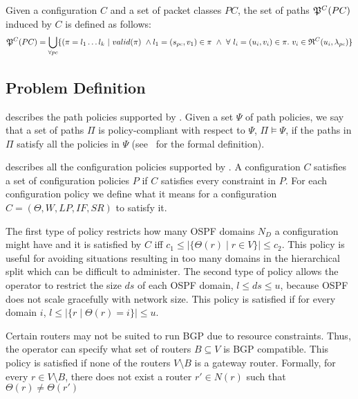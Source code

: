\begin{definition}
Given a configuration $C$ and a set of packet classes $PC$, the set of paths
$\mathfrak{P}^C(PC)$ induced by $C$ is defined as follows: 
\[
\mathfrak{P}^C(PC) = \bigcup_{\forall pc} \{(\pi=l_1\ldots l_k ~|~ valid(\pi) ~\wedge l_1 = (s_{pc}, v_1) \in \pi  ~\wedge ~\forall ~l_i=(u_i, v_i) \in \pi. ~v_i \in \mathfrak{R}^C(u_i,\lambda_{pc})\}
\]
\end{definition}

\subsection{Problem Definition}



 describes the path policies supported by \name.
Given  a set $\Psi$ of
path policies, we say that
a set of paths $\Pi$ is policy-compliant with respect to $\Psi$, $\Pi \models \Psi$,
if the paths in $\Pi$ satisfy all the policies in $\Psi$ (see~\cite{genesis} for the formal definition). 


 describes all the configuration policies supported by \name.
A configuration $C$ satisfies a set of configuration policies $P$
if $C$ satisfies every constraint in $P$.
For each configuration policy 
we define what it means for  a configuration $C=(\Theta,W,LP,IF,SR)$ to satisfy it.

The first type of policy restricts how many OSPF domains $N_D$ a
configuration might have
and it is satisfied by $C$ iff $c_1\leq |\{\Theta(r)\mid r\in V\}|\leq
c_2$.  This policy is useful for avoiding situations resulting in too
many domains in the hierarchical split which can be difficult to
administer.  The second type of policy allows the operator to restrict
the size $ds$ of each OSPF domain, $l\leq ds\leq u$, because OSPF does
not scale gracefully with network size.  This policy is satisfied if
for every domain $i$, $l\leq |\{r \mid \Theta(r)=i\}|\leq u$.


Certain 
	routers may not be suited to run BGP due to resource
	constraints. Thus, the operator can specify what set of 
	routers $B\subseteq V$ is BGP compatible.  
	This policy is satisfied if none of the routers $V\setminus B$
	is a gateway router.
	Formally, for every $r\in V\setminus B$,
	there does not exist a router $r'\in N(r)$ such that $\Theta(r) \not= \Theta(r')$

